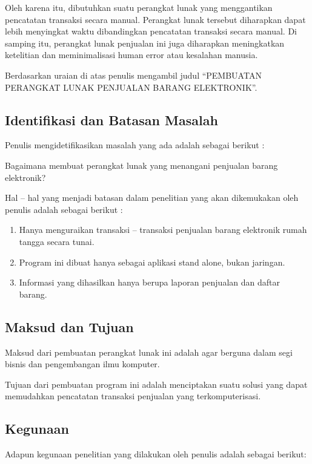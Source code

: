 \documentclass{article}
\begin{document}
Oleh karena itu, dibutuhkan suatu perangkat lunak yang menggantikan pencatatan transaksi secara manual. Perangkat lunak tersebut diharapkan dapat lebih menyingkat waktu dibandingkan pencatatan transaksi secara manual. Di samping itu, perangkat lunak penjualan ini juga diharapkan meningkatkan ketelitian dan meminimalisasi human error atau kesalahan manusia.

Berdasarkan uraian di atas penulis mengambil judul “PEMBUATAN PERANGKAT LUNAK PENJUALAN BARANG ELEKTRONIK”.

\subsection{Identifikasi dan Batasan Masalah}
Penulis mengidetifikasikan masalah yang ada adalah sebagai berikut :

Bagaimana membuat perangkat lunak yang menangani penjualan barang elektronik?

Hal – hal yang menjadi batasan dalam penelitian yang akan dikemukakan oleh penulis adalah sebagai berikut :
\begin{enumerate}
    \item Hanya menguraikan transaksi – transaksi penjualan barang elektronik rumah tangga secara tunai.
    \item Program ini dibuat hanya sebagai aplikasi stand alone, bukan jaringan.
    \item Informasi yang dihasilkan hanya berupa laporan penjualan dan daftar barang.
\end{enumerate}
\subsection{Maksud dan Tujuan}
Maksud dari pembuatan perangkat lunak ini adalah agar berguna dalam segi bisnis dan pengembangan ilmu komputer.

Tujuan dari pembuatan program ini adalah menciptakan suatu solusi yang dapat memudahkan pencatatan transaksi penjualan yang terkomputerisasi.

\subsection{Kegunaan}
Adapun kegunaan penelitian yang dilakukan oleh penulis adalah sebagai berikut:
\end{document}

